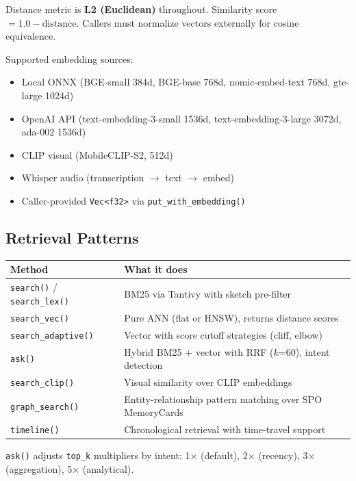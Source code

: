 Distance metric is \textbf{L2 (Euclidean)} throughout. Similarity score $= 1.0 - \text{distance}$.
Callers must normalize vectors externally for cosine equivalence.

Supported embedding sources:

\begin{itemize}
    \item Local ONNX (BGE-small 384d, BGE-base 768d, nomic-embed-text 768d, gte-large 1024d)
    \item OpenAI API (text-embedding-3-small 1536d, text-embedding-3-large 3072d, ada-002 1536d)
    \item CLIP visual (MobileCLIP-S2, 512d)
    \item Whisper audio (transcription $\to$ text $\to$ embed)
    \item Caller-provided \texttt{Vec<f32>} via \texttt{put\_with\_embedding()}
\end{itemize}

\subsection{Retrieval Patterns}

\begin{center}
\begin{tabular}{ll}
\toprule
\textbf{Method} & \textbf{What it does} \\
\midrule
\texttt{search()} / \texttt{search\_lex()} & BM25 via Tantivy with sketch pre-filter \\
\texttt{search\_vec()} & Pure ANN (flat or HNSW), returns distance scores \\
\texttt{search\_adaptive()} & Vector with score cutoff strategies (cliff, elbow) \\
\texttt{ask()} & Hybrid BM25 + vector with RRF ($k$=60), intent detection \\
\texttt{search\_clip()} & Visual similarity over CLIP embeddings \\
\texttt{graph\_search()} & Entity-relationship pattern matching over SPO MemoryCards \\
\texttt{timeline()} & Chronological retrieval with time-travel support \\
\bottomrule
\end{tabular}
\end{center}

\texttt{ask()} adjusts \texttt{top\_k} multipliers by intent: 1$\times$ (default),
2$\times$ (recency), 3$\times$ (aggregation), 5$\times$ (analytical).

